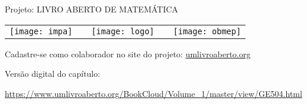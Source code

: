 \renewcommand\chapterillustration{./abertura-estatistica1}%
\def\chapterwhat{}
\def\chapterbecause{} 

\mbox{}\thispagestyle{empty}\clearpage

\thispagestyle{empty}

\begin{center}
Projeto: LIVRO ABERTO DE MATEMÁTICA

\noindent \begin{tabular}{lcccr}
\texttt{[image: impa]}& \quad\quad& \texttt{[image: logo]} & \quad\quad& \texttt{[image: obmep]} 
\end{tabular}
\end{center}

\vspace*{.3cm}

Cadastre-se como colaborador no site do projeto: \url{umlivroaberto.org}

Versão digital do capítulo:

\url{https://www.umlivroaberto.org/BookCloud/Volume_1/master/view/GE504.html}


